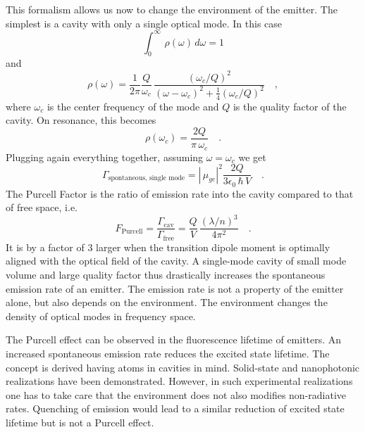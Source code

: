 This formalism allows us now to change the environment of the emitter. The simplest is a cavity with only a single optical mode. In this case 
\begin{equation}
\int_0^\infty \, \rho(\omega) \, d \omega = 1
\end{equation}
and 
\begin{equation}
 \rho(\omega)  = \frac{1}{2 \pi} \frac{Q}{\omega_c} \,
  \frac{(\omega_c / Q)^2}{(\omega - \omega_c)^2 + \frac{1}{4} (\omega_c / Q)^2} \quad ,
\end{equation}
where $\omega_c$ is the center frequency of the  mode and $Q$ is the quality factor of the cavity. On resonance, this becomes 
\begin{equation}
 \rho(\omega_c)  = \frac{2 Q} {\pi \, \omega_c}  \quad .
\end{equation}
Plugging again everything together, assuming $\omega = \omega_c$ we get
\begin{equation}
 \Gamma_\text{spontaneous, single mode} =   \left| \, \mu_{ge} \right|^2  \frac{2 Q }{ 3 \epsilon_0 \, \hbar \, V}  \quad .
\end{equation}
The Purcell Factor is the ratio of emission rate into the cavity compared to that of free space, i.e.
\begin{equation}
F_\text{Purcell} = \frac{\Gamma_\text{cav}}{\Gamma_\text{free}} =
  \frac{ Q }{V}   \,  \frac{    (\lambda / n)^3   } {4 \pi^2   }  \quad .
\end{equation}
It is by a factor of 3 larger when the transition dipole moment is optimally aligned with the optical field of the cavity. A single-mode cavity of small mode volume and large quality factor thus drastically increases the spontaneous emission rate of an emitter. The emission rate is not a property of the emitter alone, but also depends on the environment.  The environment changes the density of optical modes in frequency space.

The Purcell effect can be observed in the fluorescence lifetime of emitters. An increased spontaneous emission rate reduces the excited state lifetime. The concept is derived having atoms in cavities in mind.  Solid-state and nanophotonic realizations have been demonstrated.
However, in such experimental realizations one has to take care that the environment  does not also modifies non-radiative rates. Quenching of emission would lead to a similar reduction of excited state lifetime but is not a Purcell effect.


